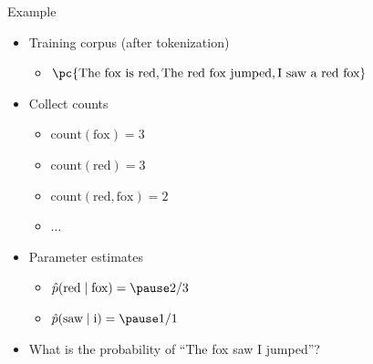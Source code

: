\documentclass[usenames,dvipsnames,notes,11pt,aspectratio=169,hyperref={colorlinks=true, linkcolor=blue}]{beamer}
\newcommand{\pdfnote}[1]{}
\begin{document}
\begin{frame}
    {Example}
    \begin{itemize}
        \item Training corpus (after tokenization)
            \begin{itemize}
                \item[] $\pc{\text{The fox is red},
                    \text{The red fox jumped},
                    \text{I saw a red fox}
                    }$
            \end{itemize}
        \item Collect counts
            \begin{itemize}
                \item[] $\text{count}(\text{fox})=3$
                \item[] $\text{count}(\text{red})=3$
                \item[] $\text{count}(\text{red}, \text{fox})=2$
                \item[] $\ldots$
            \end{itemize}
        \item Parameter estimates
            \begin{itemize}
                \item[] $\hat{p}(\text{red}\mid\text{fox})=\pause 2/3$
                \item[] $\hat{p}(\text{saw}\mid\text{i})=\pause 1/1$
            \end{itemize}
        \pause
    \item What is the probability of ``The fox saw I jumped''?\pause \hspace{2em} 
        \pdfnote{
            Zero probability: OOV words or unseen n-grams.
        }
    \end{itemize}
\end{frame}
\end{document}
